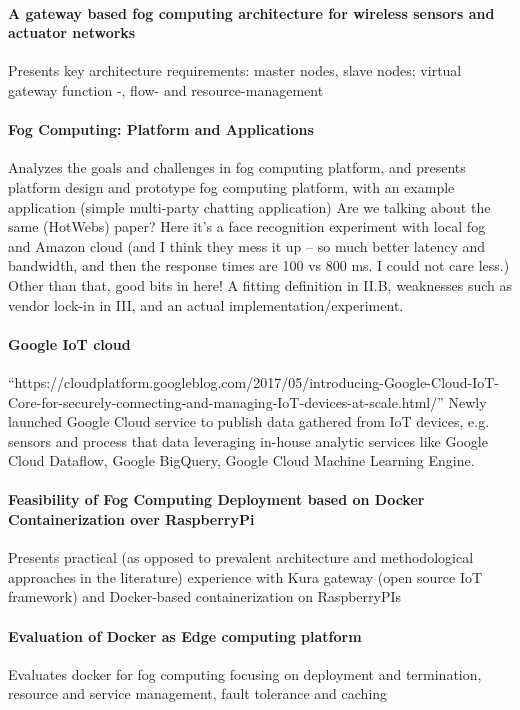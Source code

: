 \paragraph{A gateway based fog computing architecture for wireless sensors and actuator networks \cite{7423332}}
Presents key architecture requirements: master nodes, slave nodes; virtual gateway function -, flow- and resource-management


\paragraph{Fog Computing: Platform and Applications} \cite{yi_fog_2015}
Analyzes the goals and challenges in fog computing platform, and presents platform design and prototype fog computing platform, with an example application (simple multi-party chatting application)
Are we talking about the same (HotWebs) paper? Here it's a face recognition
experiment with local fog and Amazon cloud (and I think they mess it up --
so much better latency and bandwidth, and then the response times are 100 vs
800 ms. I could not care less.) Other than that, good bits in here!
A fitting definition in II.B, weaknesses such as vendor lock-in in III,
and an actual implementation/experiment.

\paragraph{Google IoT cloud}
``https://cloudplatform.googleblog.com/2017/05/introducing-Google-Cloud-IoT-Core-for-securely-connecting-and-managing-IoT-devices-at-scale.html/'' Newly launched Google Cloud service to publish data gathered from IoT devices, e.g. sensors and process that data leveraging in-house analytic services like Google Cloud Dataflow, Google BigQuery, Google Cloud Machine Learning Engine.

\paragraph{Feasibility of Fog Computing Deployment based on Docker Containerization over RaspberryPi} \cite{bellavista_feasibility_2017}
Presents practical (as opposed to prevalent architecture and methodological approaches in the literature) experience with Kura gateway (open source IoT framework) and Docker-based containerization on RaspberryPIs

\paragraph{Evaluation of Docker as Edge computing platform}\cite{ismail_evaluation_2015}
Evaluates docker for fog computing focusing on deployment and termination, resource and service management, fault tolerance and caching

